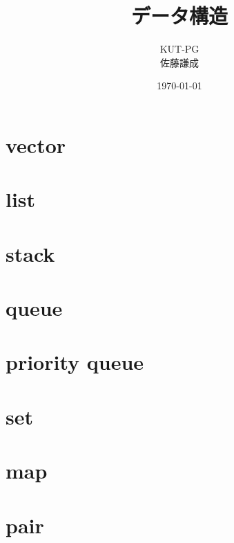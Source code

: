 \documentclass[divpdfmx]{jlreq}
\title{データ構造}
\author{KUT-PG \\ 佐藤謙成}
\date{\today}
\begin{document}
\maketitle
\section{vector}
\section{list}
\section{stack}
\section{queue}
\section{priority queue}
\section{set}
\section{map}
\section{pair}
\end{document}
